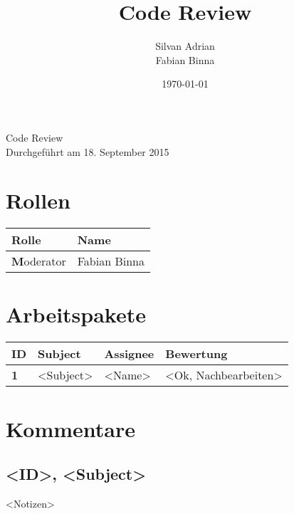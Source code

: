 \documentclass[11pt]{scrartcl}
\title{Code Review}
\author{Silvan Adrian \\ Fabian Binna}
\date{\today{}}
\begin{document}
\def\arraystretch{1.5}
\begin{titlepage}
\begin{center}
\vspace{10em}

\vspace{10em}
\end{center}
\begin{center}
\huge {Code Review}\\

Durchgeführt am 18. September 2015
\end{center}

\end{titlepage}

\newpage
\tableofcontents
\newpage

\section{Rollen}

\begin{center}

\begin{tabularx}{\linewidth}{l l}
\textbf{Rolle} & \textbf{Name}\\
\hline
\textbf Moderator & Fabian Binna\\
\end{tabularx}

\end{center}
\newpage

\section{Arbeitspakete}

\begin{center}

\begin{tabularx}{\linewidth}{l l l l}
\textbf{ID} & \textbf{Subject} & \textbf{Assignee} & \textbf{Bewertung}\\
\hline
\textbf 1 & <Subject> & <Name> & <Ok, Nachbearbeiten> \\
\end{tabularx}

\end{center}
\newpage

\section{Kommentare}

\subsection{<ID>, <Subject>}
<Notizen>
\end{document}
